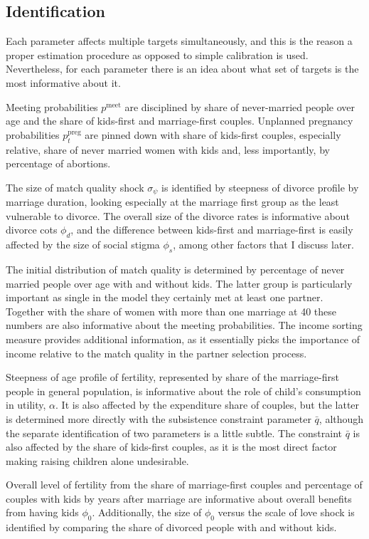 \documentclass[12pt,letter]{article}
\begin{document}
\subsection{Identification}
Each parameter affects multiple targets simultaneously, and this is the reason a proper estimation procedure as opposed to simple calibration is used. Nevertheless, for each parameter there is an idea about what set of targets is the most informative about it.

Meeting probabilities $p^{\text{meet}}$ are disciplined by share of never-married people over age and the share of kids-first and marriage-first couples. Unplanned pregnancy probabilities $p^{\text{preg}}_t$ are pinned down with share of kids-first couples, especially relative, share of never married women with kids and, less importantly, by percentage of abortions.

The size of match quality shock $\sigma_{\psi}$ is identified by steepness of divorce profile by marriage duration, looking especially at the marriage first group as the least vulnerable to divorce. The overall size of the divorce rates is informative about divorce cots $\phi_d$, and the difference between kids-first and marriage-first is easily affected by the size of social stigma $\phi_s$, among other factors that I discuss later.

The initial distribution of match quality is determined by percentage of never married people over age with and without kids. The latter group is particularly important as single in the model they certainly met at least one partner. Together with the share of women with more than one marriage at 40 these numbers are also informative about the meeting probabilities. The income sorting measure provides additional information, as it essentially picks the importance of income relative to the match quality in the partner selection process.

Steepness of age profile of fertility, represented by share of the marriage-first people in general population, is informative about the role of child's consumption in utility, $\alpha$. It is also affected by the expenditure share of couples, but the latter is determined more directly with the subsistence constraint parameter $\bar{q}$, although the separate identification of two parameters is a little subtle. The constraint $\bar{q}$ is also affected by the share of kids-first couples, as it is the most direct factor making raising children alone undesirable.
 
Overall level of fertility from the share of marriage-first couples and percentage of couples with kids by years after marriage are informative about overall benefits from having kids $\phi_0$. Additionally, the size of $\phi_0$ versus the scale of love shock is identified by comparing the share of divorced people with and without kids.
\end{document}
